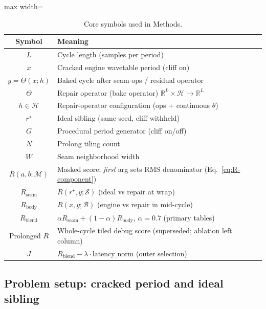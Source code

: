 \begin{table}[htbp]
  \centering
  \caption{Core symbols used in Methods.}
  \label{tab:symbols}
  \setlength{\tabcolsep}{3pt}
  \begin{adjustbox}{max width=\columnwidth}
\begin{tabular}{@{}cl@{}}
    \toprule
    Symbol & Meaning \\
    \midrule
    $L$ & Cycle length (samples per period) \\
    $x$ & Cracked engine wavetable period (cliff on) \\
    $y=\Theta(x;h)$ & Baked cycle after seam ops / residual operator \\
    $\Theta$ & Repair operator (bake operator) $\mathbb{R}^{L}\times\mathcal{H}\to\mathbb{R}^{L}$ \\
    $h\in\mathcal{H}$ & Repair-operator configuration (ops + continuous $\theta$) \\
    $r^{\star}$ & Ideal sibling (same seed, cliff withheld) \\
    $G$ & Procedural period generator (cliff on/off) \\
    $N$ & Prolong tiling count \\
    $W$ & Seam neighborhood width \\
    $R(a,b;\mathcal{M})$ & Masked score; \emph{first} arg sets RMS denominator (Eq.~\eqref{eq:R-component}) \\
    $R_{\mathrm{seam}}$ & $R(r^{\star},y;\mathcal{S})$ (ideal vs repair at wrap) \\
    $R_{\mathrm{body}}$ & $R(x,y;\mathcal{B})$ (engine vs repair in mid-cycle) \\
    $R_{\mathrm{blend}}$ & $\alpha R_{\mathrm{seam}}+(1-\alpha)R_{\mathrm{body}}$, $\alpha{=}0.7$ (primary tables) \\
    Prolonged $R$ & Whole-cycle tiled debug score (superseded; ablation left column) \\
    $J$ & $R_{\mathrm{blend}}-\lambda\cdot\mathrm{latency\_norm}$ (outer selection) \\
    \bottomrule
  \end{tabular}
\end{adjustbox}
\end{table}

\subsection{Problem setup: cracked period and ideal sibling}
\label{sec:ideal-tile}

